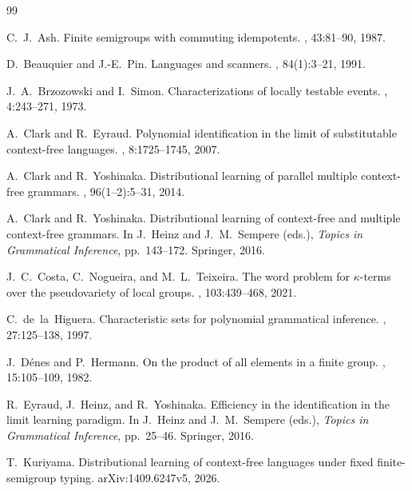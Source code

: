 \documentclass[11pt,a4paper]{ltjsarticle}
\numberwithin{equation}{section}
\theoremstyle{plain}
\theoremstyle{definition}
\theoremstyle{remark}
\theoremstyle{plain}
\begin{document}
\begin{thebibliography}{99}

C.~J.~Ash.
\newblock Finite semigroups with commuting idempotents.
,
43:81--90, 1987.

D.~Beauquier and J.-E.~Pin.
\newblock Languages and scanners.
, 84(1):3--21, 1991.

J.~A.~Brzozowski and I.~Simon.
\newblock Characterizations of locally testable events.
, 4:243--271, 1973.

A.~Clark and R.~Eyraud.
\newblock Polynomial identification in the limit of substitutable context-free
languages.
, 8:1725--1745, 2007.

A.~Clark and R.~Yoshinaka.
\newblock Distributional learning of parallel multiple context-free grammars.
, 96(1--2):5--31, 2014.

A.~Clark and R.~Yoshinaka.
\newblock Distributional learning of context-free and multiple context-free
grammars.
\newblock In J.~Heinz and J.~M.~Sempere (eds.), {\em Topics in Grammatical
Inference}, pp.~143--172. Springer, 2016.

J.~C.~Costa, C.~Nogueira, and M.~L.~Teixeira.
\newblock The word problem for $\kappa$-terms over the pseudovariety of local
groups.
, 103:439--468, 2021.

C.~de~la~Higuera.
\newblock Characteristic sets for polynomial grammatical inference.
, 27:125--138, 1997.

J.~D\'enes and P.~Hermann.
\newblock On the product of all elements in a finite group.
, 15:105--109, 1982.

R.~Eyraud, J.~Heinz, and R.~Yoshinaka.
\newblock Efficiency in the identification in the limit learning paradigm.
\newblock In J.~Heinz and J.~M.~Sempere (eds.), {\em Topics in Grammatical
Inference}, pp.~25--46. Springer, 2016.

T.~Kuriyama.
\newblock Distributional learning of context-free languages under fixed
finite-semigroup typing.
\newblock arXiv:1409.6247v5, 2026.


\end{thebibliography}
\end{document}
